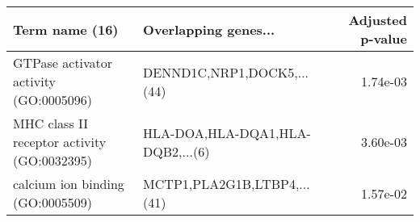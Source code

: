 \begin{tabular}{llr}
\toprule
                             Term name (16) &             Overlapping genes... &  Adjusted p-value \\
\midrule
     GTPase activator activity (GO:0005096) &       DENND1C,NRP1,DOCK5,...(44) &          1.74e-03 \\
MHC class II receptor activity (GO:0032395) & HLA-DOA,HLA-DQA1,HLA-DQB2,...(6) &          3.60e-03 \\
           calcium ion binding (GO:0005509) &      MCTP1,PLA2G1B,LTBP4,...(41) &          1.57e-02 \\
\bottomrule
\end{tabular}
